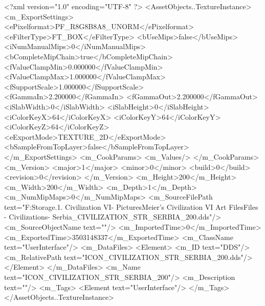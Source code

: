 <?xml version="1.0" encoding="UTF-8" ?>
<AssetObjects..TextureInstance>
	<m_ExportSettings>
		<ePixelformat>PF_R8G8B8A8_UNORM</ePixelformat>
		<eFilterType>FT_BOX</eFilterType>
		<bUseMips>false</bUseMips>
		<iNumManualMips>0</iNumManualMips>
		<bCompleteMipChain>true</bCompleteMipChain>
		<fValueClampMin>0.000000</fValueClampMin>
		<fValueClampMax>1.000000</fValueClampMax>
		<fSupportScale>1.000000</fSupportScale>
		<fGammaIn>2.200000</fGammaIn>
		<fGammaOut>2.200000</fGammaOut>
		<iSlabWidth>0</iSlabWidth>
		<iSlabHeight>0</iSlabHeight>
		<iColorKeyX>64</iColorKeyX>
		<iColorKeyY>64</iColorKeyY>
		<iColorKeyZ>64</iColorKeyZ>
		<eExportMode>TEXTURE_2D</eExportMode>
		<bSampleFromTopLayer>false</bSampleFromTopLayer>
	</m_ExportSettings>
	<m_CookParams>
		<m_Values/>
	</m_CookParams>
	<m_Version>
		<major>1</major>
		<minor>0</minor>
		<build>0</build>
		<revision>0</revision>
	</m_Version>
	<m_Height>200</m_Height>
	<m_Width>200</m_Width>
	<m_Depth>1</m_Depth>
	<m_NumMipMaps>0</m_NumMipMaps>
	<m_SourceFilePath text="F:\Mod Storage\2.1. Civilization VI\Mods\Archive - Pictures\Sid Meier's Civilization VI Art Files\Art Files - Civilizations\Civilization - Serbia\ICON_CIVILIZATION_STR_SERBIA_200.dds"/>
	<m_SourceObjectName text=""/>
	<m_ImportedTime>0</m_ImportedTime>
	<m_ExportedTime>3503148337</m_ExportedTime>
	<m_ClassName text="UserInterface"/>
	<m_DataFiles>
		<Element>
			<m_ID text="DDS"/>
			<m_RelativePath text="ICON_CIVILIZATION_STR_SERBIA_200.dds"/>
		</Element>
	</m_DataFiles>
	<m_Name text="ICON_CIVILIZATION_STR_SERBIA_200"/>
	<m_Description text=""/>
	<m_Tags>
		<Element text="UserInterface"/>
	</m_Tags>
</AssetObjects..TextureInstance>

